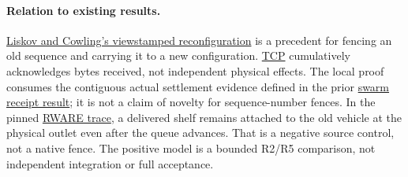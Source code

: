 \documentclass[11pt]{article}
\begin{document}
\paragraph{Relation to existing results.}
\href{https://dspace.mit.edu/entities/publication/80846d94-fcd3-40e6-87fb-8d91fe99a5d1}{Liskov and Cowling's viewstamped reconfiguration} is a precedent for fencing an old sequence and carrying it to a new configuration. \href{https://www.rfc-editor.org/rfc/rfc9293.html}{TCP} cumulatively acknowledges bytes received, not independent physical effects. The local proof consumes the contiguous actual settlement evidence defined in the prior \href{https://github.com/eternal-november/eos-research-programmes/pull/359}{swarm receipt result}; it is not a claim of novelty for sequence-number fences. In the pinned \href{https://github.com/eternal-november/eos-research-programmes/pull/418}{RWARE trace}, a delivered shelf remains attached to the old vehicle at the physical outlet even after the queue advances. That is a negative source control, not a native fence. The positive model is a bounded R2/R5 comparison, not independent integration or full acceptance.
\end{document}
